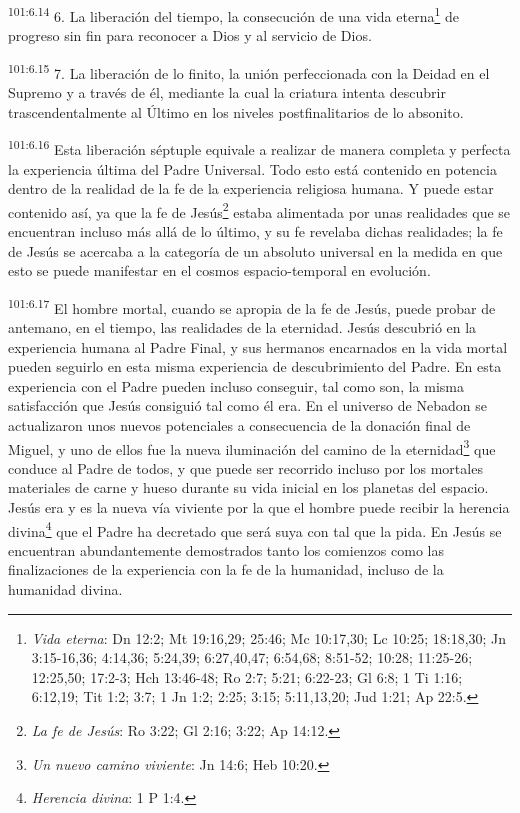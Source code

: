 \par
\textsuperscript{101:6.14} 6. La liberación del tiempo, la consecución de una vida eterna\footnote{\textit{Vida eterna}: Dn 12:2; Mt 19:16,29; 25:46; Mc 10:17,30; Lc 10:25; 18:18,30; Jn 3:15-16,36; 4:14,36; 5:24,39; 6:27,40,47; 6:54,68; 8:51-52; 10:28; 11:25-26; 12:25,50; 17:2-3; Hch 13:46-48; Ro 2:7; 5:21; 6:22-23; Gl 6:8; 1 Ti 1:16; 6:12,19; Tit 1:2; 3:7; 1 Jn 1:2; 2:25; 3:15; 5:11,13,20; Jud 1:21; Ap 22:5.} de progreso sin fin para reconocer a Dios y al servicio de Dios.

\par
\textsuperscript{101:6.15} 7. La liberación de lo finito, la unión perfeccionada con la Deidad en el Supremo y a través de él, mediante la cual la criatura intenta descubrir trascendentalmente al Último en los niveles postfinalitarios de lo absonito.

\par
\textsuperscript{101:6.16} Esta liberación séptuple equivale a realizar de manera completa y perfecta la experiencia última del Padre Universal. Todo esto está contenido en potencia dentro de la realidad de la fe de la experiencia religiosa humana. Y puede estar contenido así, ya que la fe de Jesús\footnote{\textit{La fe de Jesús}: Ro 3:22; Gl 2:16; 3:22; Ap 14:12.} estaba alimentada por unas realidades que se encuentran incluso más allá de lo último, y su fe revelaba dichas realidades; la fe de Jesús se acercaba a la categoría de un absoluto universal en la medida en que esto se puede manifestar en el cosmos espacio-temporal en evolución.

\par
\textsuperscript{101:6.17} El hombre mortal, cuando se apropia de la fe de Jesús, puede probar de antemano, en el tiempo, las realidades de la eternidad. Jesús descubrió en la experiencia humana al Padre Final, y sus hermanos encarnados en la vida mortal pueden seguirlo en esta misma experiencia de descubrimiento del Padre. En esta experiencia con el Padre pueden incluso conseguir, tal como son, la misma satisfacción que Jesús consiguió tal como él era. En el universo de Nebadon se actualizaron unos nuevos potenciales a consecuencia de la donación final de Miguel, y uno de ellos fue la nueva iluminación del camino de la eternidad\footnote{\textit{Un nuevo camino viviente}: Jn 14:6; Heb 10:20.} que conduce al Padre de todos, y que puede ser recorrido incluso por los mortales materiales de carne y hueso durante su vida inicial en los planetas del espacio. Jesús era y es la nueva vía viviente por la que el hombre puede recibir la herencia divina\footnote{\textit{Herencia divina}: 1 P 1:4.} que el Padre ha decretado que será suya con tal que la pida. En Jesús se encuentran abundantemente demostrados tanto los comienzos como las finalizaciones de la experiencia con la fe de la humanidad, incluso de la humanidad divina.

